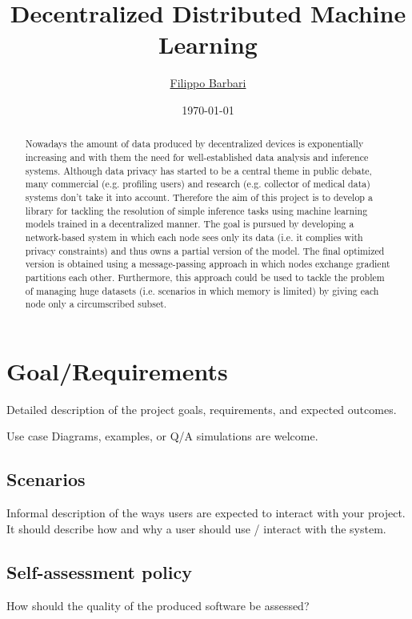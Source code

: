 \documentclass[12pt,a4paper,oneside,article]{article}
\title{Decentralized Distributed Machine Learning}
\author{\href{mailto:filippo.barbari@studio.unibo.it}{Filippo Barbari}}
\date{\today}
\begin{document}
	\maketitle
	
	\begin{abstract}
		Nowadays the amount of data produced by decentralized devices is exponentially increasing and with them the need for well-established data analysis and inference systems. 
		Although data privacy has started to be a central theme in public debate, many commercial (e.g. profiling users) and research (e.g. collector of medical data) systems don’t take it into account. Therefore the aim of this project is to develop a library for tackling the resolution of simple inference tasks using machine learning models trained in a decentralized manner. The goal is pursued by developing a network-based system in which each node sees only its data (i.e. it complies with privacy constraints) and thus owns a partial version of the model. The final optimized version is obtained using a message-passing approach in which nodes exchange gradient partitions each other. Furthermore, this approach could be used to tackle the problem of managing huge datasets (i.e. scenarios in which memory is limited) by giving each node only a circumscribed subset.
	\end{abstract}
	\clearpage
	
	\tableofcontents
	\clearpage
	
	\section{Goal/Requirements}
		Detailed description of the project goals, requirements, and expected outcomes.
		
		Use case Diagrams, examples, or Q/A simulations are welcome.
		
		\subsection{Scenarios}
			Informal description of the ways users are expected to interact with your project. It should describe how and why a user should use / interact with the system.
			
		\subsection{Self-assessment policy}
			How should the quality of the produced software be assessed?
			
\end{document}
